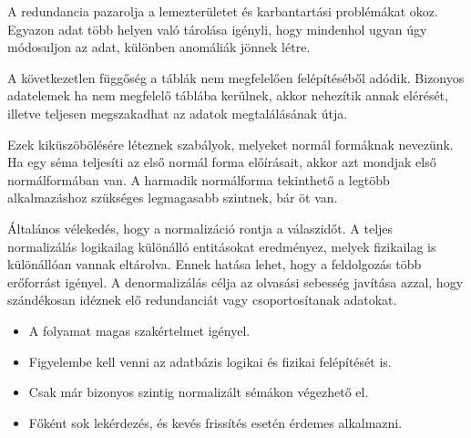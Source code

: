 A redundancia pazarolja a lemezterületet és karbantartási problémákat okoz. Egyazon adat több helyen való tárolása igényli, hogy mindenhol ugyan úgy módosuljon az adat, különben anomáliák jönnek létre.

A következetlen függőség a táblák nem megfelelően felépítéséből adódik. Bizonyos adatelemek ha nem megfelelő táblába kerülnek, akkor nehezítik annak elérését, illetve teljesen megszakadhat az adatok megtalálásának útja.

Ezek kiküszöbölésére léteznek szabályok, melyeket normál formáknak nevezünk. Ha egy séma teljesíti az első normál forma előírásait, akkor azt mondjak első normálformában van. A harmadik normálforma tekinthető a legtöbb alkalmazáshoz szükséges legmagasabb szintnek, bár öt van. \cite{normaliz}

Általános vélekedés, hogy a normalizáció rontja a válaszidőt. A teljes normalizálás logikailag különálló entitásokat eredményez, melyek fizikailag is különállóan vannak eltárolva. Ennek hatása lehet, hogy a feldolgozás több erőforrást igényel.
A denormalizálás célja az olvasási sebesség javítása azzal, hogy szándékosan idéznek elő redundanciát vagy csoportosítanak adatokat. \cite{denormaliz}
\begin{itemize}
\item A folyamat magas szakértelmet igényel.
\item Figyelembe kell venni az adatbázis logikai és fizikai felépítését is.
\item Csak már bizonyos szintig normalizált sémákon végezhető el.
\item Főként sok lekérdezés, és kevés frissítés esetén érdemes alkalmazni.
\end{itemize}






